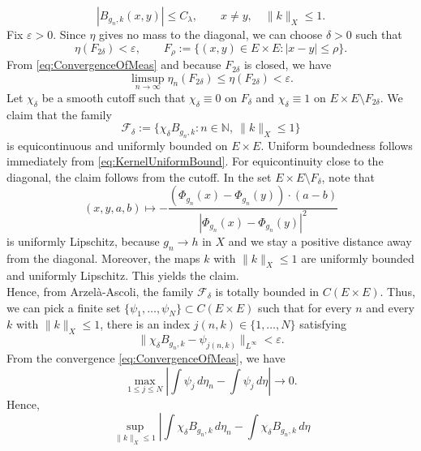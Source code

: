 \documentclass[11pt]{article}
\theoremstyle{plain}
\numberwithin{equation}{section}
\theoremstyle{definition}
\let\oldendproof\endproof
\renewenvironment{proof}[1][\proofname]{%
\oldproof[\upshape \bfseries #1]%
}{\oldendproof}
\newcommand{\eps}{\varepsilon}
\begin{document}
\begin{proof}
    \begin{equation}
        \label{eq:KernelUniformBound}
        |B_{g_n,k}(x,y)|
        \leq C_\lambda,
        \qquad x\neq y,\quad \|k\|_X\leq 1.
    \end{equation}
    Fix $\eps>0$. Since $\eta$ gives no mass to the diagonal, we can choose $\delta>0$ such that
    \begin{equation*}
        \eta(F_{2\delta})<\eps,
        \qquad
        F_\rho:=\{(x,y)\in E\times E: |x-y|\leq \rho\}.
    \end{equation*}
    From \eqref{eq:ConvergenceOfMeas} and because $F_{2\delta}$ is closed, we have
    \begin{equation}
        \label{eq:LimSupSmall}
        \limsup_{n\to\infty}\eta_n(F_{2\delta})
        \leq \eta(F_{2\delta})
        <\eps.
    \end{equation}
    Let $\chi_\delta$ be a smooth cutoff such that $\chi_\delta\equiv 0$ on $F_\delta$ and $\chi_\delta\equiv 1$ on $E\times E\setminus F_{2\delta}$. We claim that the family
    \[
        \mathcal F_\delta
        :=
        \{\chi_\delta B_{g_n,k}: n\in\mathbb N,\ \|k\|_X\leq 1\}
    \]
    is equicontinuous and uniformly bounded on $E\times E$. Uniform boundedness follows immediately from \eqref{eq:KernelUniformBound}. For equicontinuity close to the diagonal, the claim follows from the cutoff. In the set $E\times E\setminus F_\delta$, note that
    \[
        (x,y,a,b)\mapsto
        -\frac{(\Phi_{g_n}(x)-\Phi_{g_n}(y))\cdot(a-b)}
        {|\Phi_{g_n}(x)-\Phi_{g_n}(y)|^2}
    \]
    is uniformly Lipschitz, because $g_n\to h$ in $X$ and we stay a positive distance away from the diagonal. Moreover, the maps $k$ with $\|k\|_X\leq 1$ are uniformly bounded and uniformly Lipschitz. This yields the claim.\\
    Hence, from Arzelà-Ascoli, the family $\mathcal F_\delta$ is totally bounded in $C(E\times E)$. Thus, we can pick a finite set $\{\psi_1,\ldots,\psi_N\}\subset C(E\times E)$ such that for every $n$ and every $k$ with $\|k\|_X\leq 1$, there is an index $j(n,k)\in\{1,\ldots,N\}$ satisfying
    \[
        \|\chi_\delta B_{g_n,k}-\psi_{j(n,k)}\|_{L^\infty}<\eps.
    \]
    From the convergence \eqref{eq:ConvergenceOfMeas}, we have
    \[
        \max_{1\leq j\leq N}
        \left|
            \int \psi_j\,d\eta_n
            -
            \int \psi_j\,d\eta
        \right|
        \to 0.
    \]
    Hence,
    \[
        \sup_{\|k\|_X\leq 1}
        \left|
            \int \chi_\delta B_{g_n,k}\,d\eta_n
            -
            \int \chi_\delta B_{g_n,k}\,d\eta
\]
\end{proof}
\end{document}
